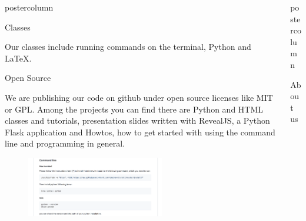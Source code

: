 \documentclass{beamer}
\newlength{\columnheight}
\begin{document}
\begin{frame}
\begin{columns}
\begin{column}{.33\textwidth}
\begin{beamercolorbox}[center,wd=\textwidth]{postercolumn}
\begin{minipage}[T]{.95\textwidth}
{\begin{myblock}{Classes}
\begin{addmargin}[1em]{1em}
                            Our classes include running commands on the terminal, Python and \LaTeX.
                        \end{addmargin}
                    \end{myblock}\vfill
                    \vspace{1.25cm}
					\begin{myblock}{Open Source}
					    \begin{addmargin}[1em]{1em}
                            We are publishing our code on github under open source licenses like MIT or GPL.
                            Among the projects you can find there are Python and HTML classes and tutorials, presentation slides written with RevealJS,
                            a Python Flask application and Howtos, how to get started with using the command line and programming in general.
                        \end{addmargin}
                        \begin{addmargin}[1em]{1em}
                            \begin{figure}
                                \vspace{1cm}
                                \centering\includegraphics[width=0.59\textwidth]{img/cmd.png}
                                \vspace{1cm}
                            \end{figure}
                        \end{addmargin}
                    \end{myblock}\vfill
		}\end{minipage}\end{beamercolorbox}
	\end{column}
  \begin{column}{.33\textwidth}
		\begin{beamercolorbox}[center,wd=\textwidth]{postercolumn}
			\begin{minipage}[T]{.95\textwidth}
				\parbox[t][\columnheight]{\textwidth}{
					\begin{myblock}{About us}
                        \begin{addmargin}[1em]{1em}

\end{addmargin}
\end{myblock}}
\end{minipage}
\end{beamercolorbox}
\end{column}
\end{columns}
\end{frame}
\end{document}
